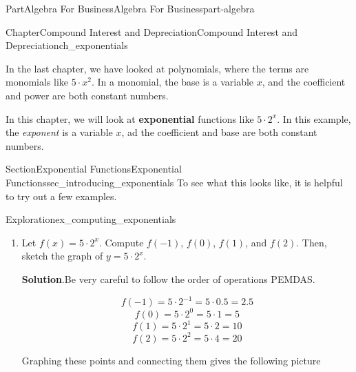 \documentclass[oneside,10pt,]{tufte-book}
\newcommand{\blocktitlefont}{\relax}
\newcommand{\terminology}[1]{\textbf{#1}}
\numberwithin{equation}{chapter}
\begin{document}
\begin{partptx}{Part}{Algebra For Business}{}{Algebra For Business}{}{}{part-algebra}
%
\typeout{************************************************}
\typeout{************************************************}
%
\begin{chapterptx}{Chapter}{Compound Interest and Depreciation}{}{Compound Interest and Depreciation}{}{}{ch_exponentials}
\renewcommand*{\chaptername}{Chapter}
\begin{introduction}{}%
In the last chapter, we have looked at polynomials, where the terms are monomials like \(5\cdot x^2\). In a monomial, the base is a variable \(x\), and the coefficient and power are both  constant numbers.%
\par
In this chapter, we will look at \terminology{exponential} functions like \(5\cdot 2^x\). In this example, the \emph{exponent} is a variable \(x\), ad the coefficient and base are both constant numbers.%
\end{introduction}%
%
%
\typeout{************************************************}
\typeout{************************************************}
%
\begin{sectionptx}{Section}{Exponential Functions}{}{Exponential Functions}{}{}{sec_introducing_exponentials}
To see what this looks like, it is helpful to try out a few examples.%
\begin{exploration}{Exploration}{}{ex_computing_exponentials}%
\begin{enumerate}[font=\bfseries,label=(\alph*),ref=\alph*]%
\item{}Let \(f(x) = 5\cdot 2^x\). Compute  \(f(-1)\), \(f(0)\), \(f(1)\), and \(f(2)\). Then, sketch the graph of \(y=5\cdot 2^x\).%
\par\smallskip%
\noindent\textbf{\blocktitlefont Solution}.\hypertarget{ex_computing_exponentials-1-2}{}\quad{}Be very careful to follow the order of operations PEMDAS.%
\par
%
\begin{equation*}
f(-1) = 5\cdot 2^{-1} = 5 \cdot 0.5 = 2.5
\end{equation*}
%
\begin{equation*}
f(0) = 5\cdot 2^{0} = 5 \cdot 1 = 5
\end{equation*}
%
\begin{equation*}
f(1) = 5\cdot 2^{1} = 5 \cdot 2 = 10
\end{equation*}
%
\begin{equation*}
f(2) = 5\cdot 2^{2} = 5 \cdot 4 = 20
\end{equation*}
%
\par
Graphing these points and connecting them gives the following picture%
\begin{image}{0.25}{0.5}{0.25}{}%
\end{image}
\end{enumerate}
\end{exploration}
\end{sectionptx}
\end{chapterptx}
\end{partptx}
\end{document}
